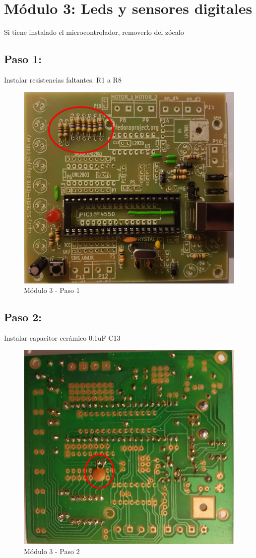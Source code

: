 \chapter{Módulo 3: Leds y sensores digitales}

Si tiene instalado el microcontrolador, removerlo del zócalo

\section{Paso 1:}

Instalar resistencias faltantes. R1 a R8

\begin{figure}[h]
	\centering
	\includegraphics[width=0.8\linewidth]{Modulo_3/M3_1}
	\caption{Módulo 3 - Paso 1}
	\label{fig:M3_1}
\end{figure}

\newpage

\section{Paso 2:}

Instalar capacitor cerámico 0.1uF C13

\begin{figure}[h]
	\centering
	\includegraphics[width=0.8\linewidth]{Modulo_3/M3_2}
	\caption{Módulo 3 - Paso 2}
	\label{fig:M3_2}
\end{figure}

